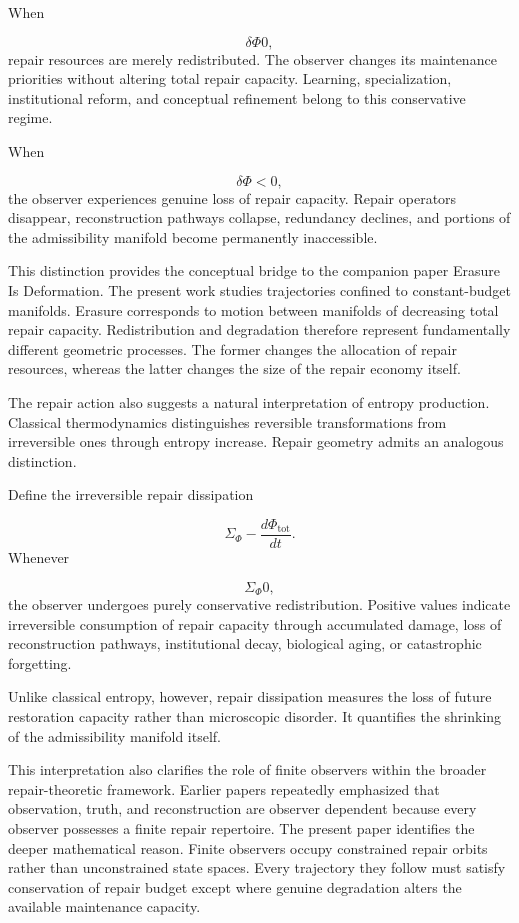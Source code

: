 \documentclass[12pt,oneside]{article}
\theoremstyle{plain}
\theoremstyle{definition}
\theoremstyle{remark}
\begin{document}
When

\[
\delta\Phi
0,
\]
repair resources are merely redistributed. The observer changes its maintenance priorities without altering total repair capacity. Learning, specialization, institutional reform, and conceptual refinement belong to this conservative regime.

When

\[
\delta\Phi
<
0,
\]
the observer experiences genuine loss of repair capacity. Repair operators disappear, reconstruction pathways collapse, redundancy declines, and portions of the admissibility manifold become permanently inaccessible.

This distinction provides the conceptual bridge to the companion paper Erasure Is Deformation. The present work studies trajectories confined to constant-budget manifolds. Erasure corresponds to motion between manifolds of decreasing total repair capacity. Redistribution and degradation therefore represent fundamentally different geometric processes. The former changes the allocation of repair resources, whereas the latter changes the size of the repair economy itself.

The repair action also suggests a natural interpretation of entropy production. Classical thermodynamics distinguishes reversible transformations from irreversible ones through entropy increase. Repair geometry admits an analogous distinction.

Define the irreversible repair dissipation

\[
\Sigma_{\Phi}
- 
\frac{d\Phi_{\mathrm{tot}}}{dt}.
\]
Whenever

\[
\Sigma_{\Phi}
0,
\]
the observer undergoes purely conservative redistribution. Positive values indicate irreversible consumption of repair capacity through accumulated damage, loss of reconstruction pathways, institutional decay, biological aging, or catastrophic forgetting.

Unlike classical entropy, however, repair dissipation measures the loss of future restoration capacity rather than microscopic disorder. It quantifies the shrinking of the admissibility manifold itself.

This interpretation also clarifies the role of finite observers within the broader repair-theoretic framework. Earlier papers repeatedly emphasized that observation, truth, and reconstruction are observer dependent because every observer possesses a finite repair repertoire. The present paper identifies the deeper mathematical reason. Finite observers occupy constrained repair orbits rather than unconstrained state spaces. Every trajectory they follow must satisfy conservation of repair budget except where genuine degradation alters the available maintenance capacity.
\end{document}
